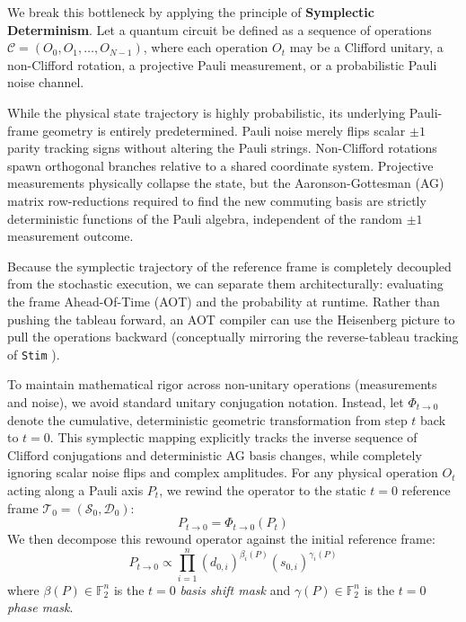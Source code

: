 \documentclass[aps,prx,reprint,superscriptaddress,nofootinbib]{revtex4-2}
\theoremstyle{definition}
\begin{document}
We break this bottleneck by applying the principle of \textbf{Symplectic Determinism}. Let a quantum circuit be defined as a sequence of operations $\mathcal{C} = (O_0, O_1, \dots, O_{N-1})$, where each operation $O_t$ may be a Clifford unitary, a non-Clifford rotation, a projective Pauli measurement, or a probabilistic Pauli noise channel.

While the physical state trajectory is highly probabilistic, its underlying Pauli-frame geometry is entirely predetermined. Pauli noise merely flips scalar $\pm 1$ parity tracking signs without altering the Pauli strings. Non-Clifford rotations spawn orthogonal branches relative to a shared coordinate system. Projective measurements physically collapse the state, but the Aaronson-Gottesman (AG) matrix row-reductions \cite{aaronson2004} required to find the new commuting basis are strictly deterministic functions of the Pauli algebra, independent of the random $\pm 1$ measurement outcome.

Because the symplectic trajectory of the reference frame is completely decoupled from the stochastic execution, we can separate them architecturally: evaluating the frame Ahead-Of-Time (AOT) and the probability at runtime. Rather than pushing the tableau forward, an AOT compiler can use the Heisenberg picture to pull the operations backward (conceptually mirroring the reverse-tableau tracking of \texttt{Stim} \cite{gidney2021stim}).

To maintain mathematical rigor across non-unitary operations (measurements and noise), we avoid standard unitary conjugation notation. Instead, let $\Phi_{t \to 0}$ denote the cumulative, deterministic geometric transformation from step $t$ back to $t=0$. This symplectic mapping explicitly tracks the inverse sequence of Clifford conjugations and deterministic AG basis changes, while completely ignoring scalar noise flips and complex amplitudes. For any physical operation $O_t$ acting along a Pauli axis $P_t$, we rewind the operator to the static $t=0$ reference frame $\mathcal{T}_0 = (\mathcal{S}_0, \mathcal{D}_0)$:
\begin{equation}
    P_{t \to 0} = \Phi_{t \to 0}(P_t)
\end{equation}
We then decompose this rewound operator against the initial reference frame:
\begin{equation}
    P_{t \to 0} \propto \prod_{i=1}^n (d_{0,i})^{\beta_i(P)} (s_{0,i})^{\gamma_i(P)}
\end{equation}
where $\beta(P) \in \mathbb{F}_2^n$ is the $t=0$ \textit{basis shift mask} and $\gamma(P) \in \mathbb{F}_2^n$ is the $t=0$ \textit{phase mask}.
\end{document}
